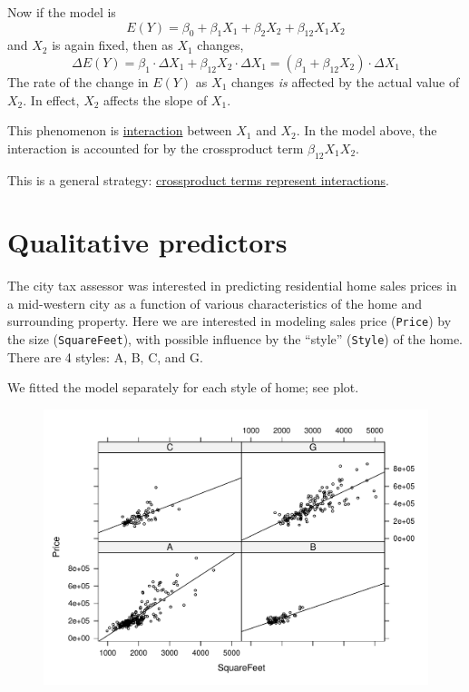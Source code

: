\documentclass[12pt]{article}
\begin{document}
Now if the model is
\[
E(Y) = \beta_0 + \beta_1 X_1 + \beta_2 X_2 + \beta_{12}X_1X_2
\]
and $X_2$ is again fixed, then as $X_1$ changes,
\[
\Delta E(Y)
= \beta_1 \cdot \Delta X_1 + \beta_{12}X_2\cdot \Delta X_1
= (\beta_1 + \beta_{12}X_2) \cdot \Delta X_1
\]
The rate of the change in $E(Y)$ as $X_1$ changes
\emph{is} affected by the actual value of $X_2$.
In effect, $X_2$ affects the slope of $X_1$.

This phenomenon is \underline{interaction}
between $X_1$ and $X_2$. In the model above,
the interaction is accounted for by the crossproduct term
$\beta_{12}X_1X_2$.

This is a general strategy:
\underline{crossproduct terms represent interactions}.


\section{Qualitative predictors}

\example
The city tax assessor was interested in predicting residential home
sales prices in a mid-western city as a function of various
characteristics of the home and surrounding property.
Here we are interested in modeling sales price (\verb+Price+)
by the size (\verb+SquareFeet+),
with possible influence by the ``style'' (\verb+Style+) of the home.
There are 4 styles: A, B, C, and G.

We fitted the model separately for each style of home;
see plot.

\begin{figure}
\begin{center}
\includegraphics[width=.95\textwidth]{part11-sales.pdf}
\end{center}
\end{figure}
\end{document}
